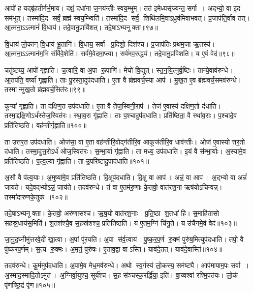 आपो॑ ह॒ यद्बृ॑ह॒तीर्गर्भ॒माय\snn{}। दक्षं॒ दधा॑ना ज॒नय॑न्तीः स्वय॒म्भुम्‌। 
तत॑ इ॒मेध्यसृ॑ज्यन्त॒ सर्गा। अद्भ्यो॒ वा इ॒द सम॑भूत्‌। 
तस्मा॑दि॒द सर्वं॒ ब्रह्म॑ स्वय॒म्भ्विति॑। 
तस्मा॑दि॒द सर्व॒ शिथि॑लमि॒वाऽध्रुव॑मिवाभवत्‌। 
प्र॒जाप॑ति॒र्वाव तत्‌। आ॒त्मना॒ऽऽत्मानं॑ वि॒धाय॑। 
तदे॒वानु॒प्रावि॑शत्‌। तदे॒षाऽभ्यनूक्ता॥९७॥


वि॒धाय॑ लो॒कान्‌ वि॒धाय॑ भू॒तानि॑। वि॒धाय॒ सर्वा प्र॒दिशो॒ दिश॑श्च। 
प्र॒जाप॑तिः प्रथम॒जा ऋ॒तस्य॑। आ॒त्मना॒ऽऽत्मान॑म॒भि संवि॑वे॒शेति॑। 
सर्व॑मे॒वेदमा॒प्त्वा। सर्व॑मव॒रुद्ध्य॑। 
तदे॒वानु॒प्रवि॑शति। य ए॒वं वेद॑॥९८॥\anuvakamend


चतु॑ष्टय्य॒ आपो॑ गृह्णाति। च॒त्वारि॒ वा अ॒पा रू॒पाणि॑। 
मेघो॑ वि॒द्युत्‌। स्त॒न॒यि॒त्नुर्वृ॒ष्टिः। तान्ये॒वाव॑रुन्धे। 
आ॒तप॑ति॒ वर्ष्या॑ गृह्णाति। ताः पु॒रस्ता॒दुप॑दधाति। 
ए॒ता वै ब्र॑ह्मवर्च॒स्या आप॑। मु॒ख॒त ए॒व ब्र॑ह्मवर्च॒समव॑रुन्धे। 
तस्मान्मुख॒तो ब्र॑ह्मवर्च॒सित॑रः॥९९॥


कूप्या॑ गृह्णाति। ता द॑क्षिण॒त उप॑दधाति। 
ए॒ता वै ते॑ज॒स्विनी॒राप॑। तेज॑ ए॒वास्य॑ दक्षिण॒तो द॑धाति। 
तस्मा॒द्दक्षि॒णोऽर्ध॑स्तेज॒स्वित॑रः। स्था॒व॒रा गृ॑ह्णाति। 
ताः प॒श्चादुप॑दधाति। प्रति॑ष्ठिता॒ वै स्था॑व॒राः। 
प॒श्चादे॒व प्रति॑तिष्ठति। वह॑न्तीर्गृह्णाति॥१००॥


ता उ॑त्तर॒त उप॑दधाति। ओज॑सा॒ वा ए॒ता वह॑न्तीरि॒वोद्ग॑तीरि॒व आकूज॑तीरि॒व धाव॑न्तीः। 
ओज॑ ए॒वास्योत्तर॒तो द॑धाति। तस्मा॒दुत्त॒रोऽर्ध॑ ओज॒स्वित॑रः। 
स॒म्भा॒र्या गृ॑ह्णाति। ता मध्य॒ उप॑दधाति। 
इ॒यं वै स॑म्भा॒र्याः। अ॒स्यामे॒व प्रति॑तिष्ठति। 
प॒ल्व॒ल्या गृ॑ह्णाति। ता उ॒परि॑ष्टादु॒पाद॑धाति॥१०१॥


अ॒सौ वै प॑ल्व॒याः। अ॒मुष्या॑मे॒व प्रति॑तिष्ठति। 
दि॒क्षूप॑दधाति। दि॒क्षु वा आप॑। 
अन्नं॒ वा आप॑। अ॒द्भ्यो वा अन्नं॑ जायते। 
यदे॒वद्भ्योऽन्नं॒ जाय॑ते। तदव॑रुन्धे। 
तं वा ए॒तम॑रु॒णाः के॒तवो॒ वात॑रश॒ना ऋष॑योऽचिन्वन्न्‌। 
तस्मा॑दारुणके॒तुक॑॥१०२॥


तदे॒षाऽभ्यनूक्ता। के॒तवो॒ अरु॑णासश्च। 
ऋ॒ष॒यो वात॑रश॒नाः। प्र॒ति॒ष्ठा श॒तधा॑ हि। 
स॒माहि॑तासो सहस्र॒धाय॑स॒मिति॑। श॒तश॑श्चै॒व स॒हस्र॑शश्च॒ प्रति॑तिष्ठति। 
य ए॒तम॒ग्निं चि॑नु॒ते। य उ॑चैनमे॒वं वेद॑॥१०३॥\anuvakamend


जा॒नु॒द॒घ्नीमु॑त्तरवे॒दीं खा॒त्वा। अ॒पां पू॑रयति। 
अ॒पा स॑र्व॒त्वाय॑। पु॒ष्क॒र॒प॒र्ण रु॒क्मं पुरु॑ष॒मित्युप॑दधाति। 
तपो॒ वै पु॑ष्करप॒र्णम्‌। स॒त्य रु॒क्मः। 
अ॒मृतं॒ पुरु॑षः। ए॒ताव॒द्वा वाऽस्ति। 
याव॑दे॒तत्। याव॑दे॒वास्ति॑॥१०४॥


तदव॑रुन्धे। कू॒र्ममुप॑दधाति। 
अ॒पामे॒व मेध॒मव॑रुन्धे। अथो स्व॒र्गस्य॑ लो॒कस्य॒ सम॑ष्ट्यै। 
आप॑मापाम॒पः सर्वा। अ॒स्माद॒स्मादि॒तोऽमुत॑। 
अ॒ग्निर्वा॒युश्च॒ सूर्य॑श्च। स॒ह स॑ञ्चस्क॒रर्द्धि॑या॒ इति॑। 
वा॒य्वश्वा॑ रश्मि॒पत॑यः। लो॒कं पृ॑णच्छि॒द्रं पृ॑ण॥१०५॥


